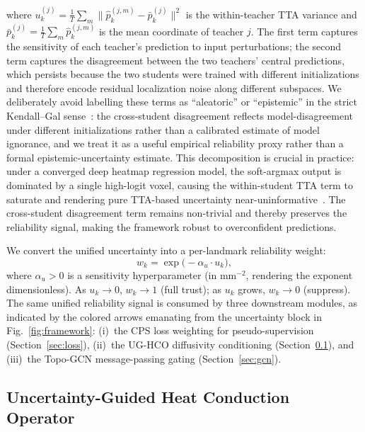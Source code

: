 \documentclass[conference]{IEEEtran}
\begin{document}
where $u_k^{(j)} = \tfrac{1}{T}\sum_{m}\!\bigl\|\hat{p}_k^{(j,m)} - \bar{p}_k^{(j)}\bigr\|^2$ is the within-teacher TTA variance and $\bar{p}_k^{(j)} = \tfrac{1}{T}\sum_{m}\hat{p}_k^{(j,m)}$ is the mean coordinate of teacher $j$. The first term captures the sensitivity of each teacher's prediction to input perturbations; the second term captures the disagreement between the two teachers' central predictions, which persists because the two students were trained with different initializations and therefore encode residual localization noise along different subspaces. We deliberately avoid labelling these terms as ``aleatoric'' or ``epistemic'' in the strict Kendall--Gal sense~\cite{Kendall2017_uncertainty}: the cross-student disagreement reflects model-disagreement under different initializations rather than a calibrated estimate of model ignorance, and we treat it as a useful empirical reliability proxy rather than a formal epistemic-uncertainty estimate. This decomposition is crucial in practice: under a converged deep heatmap regression model, the soft-argmax output is dominated by a single high-logit voxel, causing the within-student TTA term to saturate and rendering pure TTA-based uncertainty near-uninformative~\cite{Yu2019_uncertainty_aware}. The cross-student disagreement term remains non-trivial and thereby preserves the reliability signal, making the framework robust to overconfident predictions.

We convert the unified uncertainty into a per-landmark reliability weight:
\begin{equation}
  w_k = \exp\!\bigl(-\alpha_u \cdot u_k\bigr),
  \label{eq:weight}
\end{equation}
where $\alpha_u > 0$ is a sensitivity hyperparameter (in mm$^{-2}$, rendering the exponent dimensionless). As $u_k \to 0$, $w_k \to 1$ (full trust); as $u_k$ grows, $w_k \to 0$ (suppress). The same unified reliability signal is consumed by three downstream modules, as indicated by the colored arrows emanating from the uncertainty block in Fig.~\ref{fig:framework}: (i)~the CPS loss weighting for pseudo-supervision (Section~\ref{sec:loss}), (ii)~the UG-HCO diffusivity conditioning (Section~\ref{sec:ughco}), and (iii)~the Topo-GCN message-passing gating (Section~\ref{sec:gcn}).

\subsection{Uncertainty-Guided Heat Conduction Operator}
\label{sec:ughco}
\end{document}
